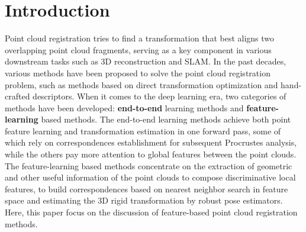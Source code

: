 \documentclass[10pt,twocolumn,letterpaper]{article}
\begin{document}
\vspace{-1.5em}
\section{Introduction}
\vspace{-.25em}
\label{sec:intro}





Point cloud registration tries to find a transformation that best aligns two overlapping point cloud fragments, serving as a key component in various downstream tasks such as 3D reconstruction\cite{geiger2011stereoscan} and SLAM\cite{salas2013slam++,zhang2015visual}. In the past decades, various methods have been proposed to solve the point cloud registration problem, such as methods based on direct transformation optimization \cite{besl1992method,rusinkiewicz2001efficient,yang2015go} and hand-crafted descriptors\cite{rusu2008aligning,rusu2009fast,tombari2010unique}. When it comes to the deep learning era, two categories of methods have been developed: {\bf end-to-end} learning methods and {\bf feature-learning} based methods. The end-to-end learning methods achieve both point feature learning and transformation estimation in one forward pass, some of which \cite{wang2019deep,wang2019prnet,yew2020rpm,fu2021robust,choy2020deep,lee2021deep,lu2021hregnet,qin2022geometric} rely on correspondences establishment for subsequent Procrustes analysis, while the others pay more attention to global features between the point clouds\cite{aoki2019pointnetlk,sarode2019pcrnet,huang2020feature,xu2021omnet,xu2021finet}. The feature-learning based  methods\cite{rusu2008aligning,rusu2009fast,tombari2010unique,deng2018ppfnet,deng2018ppf,gojcic2019perfect,choy2019fully,bai2020d3feat,huang2021predator,ao2021spinnet,yu2021cofinet} concentrate on the extraction of geometric and other useful information of the point clouds to compose discriminative local features, to build correspondences based on nearest neighbor search in feature space and estimating the 3D rigid transformation by robust pose estimators\cite{fischler1981random,yang2020teaser}. Here, this paper focus on the discussion of feature-based point cloud registration methods.
\end{document}
